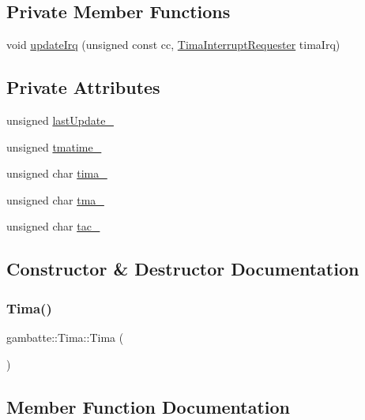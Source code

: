 \subsection*{Private Member Functions}
\begin{DoxyCompactItemize}
\item 
void \hyperlink{classgambatte_1_1Tima_adbbd88e7c35830157e60ee06e7f4dc05}{update\+Irq} (unsigned const cc, \hyperlink{classgambatte_1_1TimaInterruptRequester}{Tima\+Interrupt\+Requester} tima\+Irq)
\end{DoxyCompactItemize}
\subsection*{Private Attributes}
\begin{DoxyCompactItemize}
\item 
unsigned \hyperlink{classgambatte_1_1Tima_ac448ab51bb8f7d47927f86a238513238}{last\+Update\+\_\+}
\item 
unsigned \hyperlink{classgambatte_1_1Tima_a7badef965f06c5b99ab6c90216b6d67b}{tmatime\+\_\+}
\item 
unsigned char \hyperlink{classgambatte_1_1Tima_afe4fa0fb57c9c5a5a0218bdd1d440c89}{tima\+\_\+}
\item 
unsigned char \hyperlink{classgambatte_1_1Tima_ab7d524d7391f3450e7e3a5477dead85c}{tma\+\_\+}
\item 
unsigned char \hyperlink{classgambatte_1_1Tima_a85c00bd12ac64c4a334de4f08032cb9f}{tac\+\_\+}
\end{DoxyCompactItemize}


\subsection{Constructor \& Destructor Documentation}
\mbox{\label{classgambatte_1_1Tima_a335d610e3c5aeef9f80b7693d414d42e}} 
\subsubsection{\texorpdfstring{Tima()}{Tima()}}
{\footnotesize\ttfamily gambatte\+::\+Tima\+::\+Tima (\begin{DoxyParamCaption}{ }\end{DoxyParamCaption})}



\subsection{Member Function Documentation}
\mbox{\label{classgambatte_1_1Tima_a9bf4e6fead69bda13cab7e7565d1c414}} 

